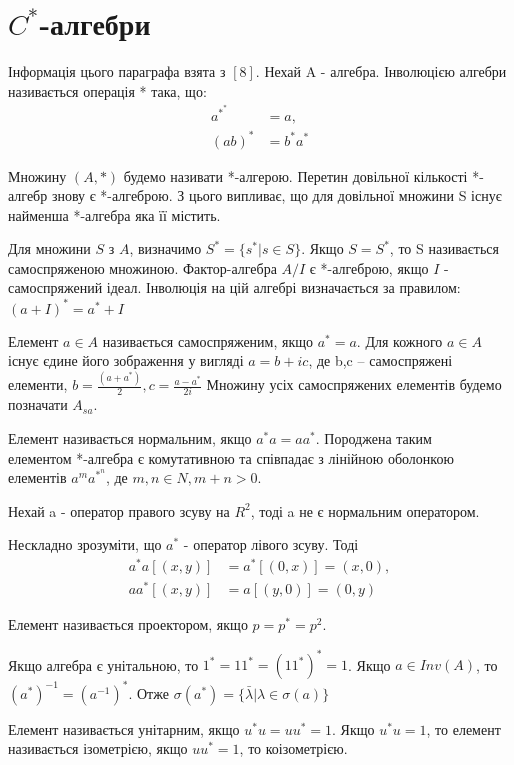 \newpage
\section{$C^*$-алгебри}\label{sec:theoretical-statements}
Інформація цього параграфа взята з $[8]$.
Нехай A - алгебра.
Інволюцією алгебри називається операція * така, що:
\begin{align}
    a^*^* &= a, \\
    (ab)^* &= b^* a^*
\end{align}

Множину $(A,*)$ будемо називати *-алгерою.
Перетин довільної кількості *-алгебр знову є *-алгеброю.
З цього випливає, що для довільної множини S існує найменша *-алгебра яка її містить.

Для множини $S$ з $A$, визначимо $S^* = \{s^*| s \in S\}$.
Якщо $S = S^*$, то S називається самоспряженою множиною.
Фактор-алгебра $A/I$ є *-алгеброю, якщо $I$ - самоспряжений ідеал.
Інволюція на цій алгебрі визначається за правилом:$(a+I)^*=a^*+I$

Елемент $a \in A$ називається самоспряженим, якщо $a^* = a$.
Для кожного $a \in A$ існує єдине його зображення у вигляді $a = b + ic$,
де b,c -- самоспряжені елементи, $b = \frac{(a + a^*)}{2}, c = \frac{a - a^*}{2i}$
Множину усіх самоспряжених елементів будемо позначати $A_{sa}$.

Елемент називається нормальним, якщо $a^*a = aa^*$.
Породжена таким \\
елементом *-алгебра є комутативною та співпадає з
лінійною оболонкою \\ елементів $a^m a^*^n$, де $m,n \in N, m+n > 0$.
\begin{example}
    Нехай a - оператор правого зсуву на $R^2$,
    тоді a не є нормальним оператором.

    Нескладно зрозуміти, що $a^*$ - оператор лівого зсуву.
    Тоді
    \begin{align*}
        a^* a[(x,y)] &= a^*[(0,x)] = (x,0), \\
        a a^*[(x,y)] &= a[(y,0)] = (0,y)
    \end{align*}
\end{example}

Елемент називається проектором, якщо  $p = p^* = p^2$.

Якщо алгебра є унітальною, то $1^* = 1 1^* = (1 1^*)^* = 1$.
Якщо $a \in Inv(A)$, то $(a^*)^{-1} = (a^{-1})^*$.
Отже $\sigma(a^*) = \{\bar{\lambda} | \lambda \in \sigma(a) \}$

Елемент називається унітарним, якщо $u^* u = u u^* = 1$.
Якщо $u^* u = 1$, то елемент називається ізометрією, якщо $u u^* = 1$, то коізометрією.

